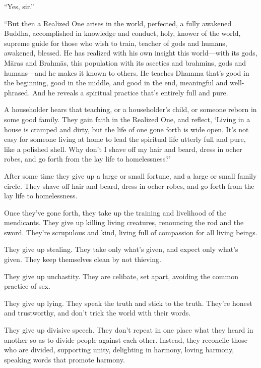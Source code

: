 \documentclass[12pt,openany]{book}%
\begin{document}
“Yes, sir.” 

“But then a Realized One arises in the world, perfected, a fully awakened Buddha, accomplished in knowledge and conduct, holy, knower of the world, supreme guide for those who wish to train, teacher of gods and humans, awakened, blessed. He has realized with his own insight this world—with its gods, \textsanskrit{Māras} and \textsanskrit{Brahmās}, this population with its ascetics and brahmins, gods and humans—and he makes it known to others. He teaches Dhamma that’s good in the beginning, good in the middle, and good in the end, meaningful and well-phrased. And he reveals a spiritual practice that’s entirely full and pure. 

A householder hears that teaching, or a householder’s child, or someone reborn in some good family. They gain faith in the Realized One, and reflect, ‘Living in a house is cramped and dirty, but the life of one gone forth is wide open. It’s not easy for someone living at home to lead the spiritual life utterly full and pure, like a polished shell. Why don’t I shave off my hair and beard, dress in ocher robes, and go forth from the lay life to homelessness?’ 

After some time they give up a large or small fortune, and a large or small family circle. They shave off hair and beard, dress in ocher robes, and go forth from the lay life to homelessness. 

Once they’ve gone forth, they take up the training and livelihood of the mendicants. They give up killing living creatures, renouncing the rod and the sword. They’re scrupulous and kind, living full of compassion for all living beings. 

They give up stealing. They take only what’s given, and expect only what’s given. They keep themselves clean by not thieving. 

They give up unchastity. They are celibate, set apart, avoiding the common practice of sex. 

They give up lying. They speak the truth and stick to the truth. They’re honest and trustworthy, and don’t trick the world with their words. 

They give up divisive speech. They don’t repeat in one place what they heard in another so as to divide people against each other. Instead, they reconcile those who are divided, supporting unity, delighting in harmony, loving harmony, speaking words that promote harmony. 
\end{document}
